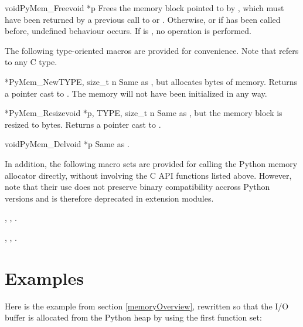 \documentclass{manual}
\begin{document}
\begin{cfuncdesc}{void}{PyMem_Free}{void *p}
Frees the memory block pointed to by , which must have been
returned by a previous call to  or
.  Otherwise, or if
 has been called before, undefined behaviour
occurs. If  is \NULL{}, no operation is performed.
\end{cfuncdesc}

The following type-oriented macros are provided for convenience.  Note 
that  refers to any C type.

\begin{cfuncdesc}{*}{PyMem_New}{TYPE, size_t n}
Same as , but allocates  bytes of memory.  Returns a pointer cast to
.
The memory will not have been initialized in any way.
\end{cfuncdesc}

\begin{cfuncdesc}{*}{PyMem_Resize}{void *p, TYPE, size_t n}
Same as , but the memory block is resized
to  bytes.  Returns a pointer
cast to .
\end{cfuncdesc}

\begin{cfuncdesc}{void}{PyMem_Del}{void *p}
Same as .
\end{cfuncdesc}

In addition, the following macro sets are provided for calling the
Python memory allocator directly, without involving the C API functions
listed above. However, note that their use does not preserve binary
compatibility accross Python versions and is therefore deprecated in
extension modules.

, , .

, , .


\section{Examples \label{memoryExamples}}

Here is the example from section \ref{memoryOverview}, rewritten so
that the I/O buffer is allocated from the Python heap by using the
first function set:
\end{document}
